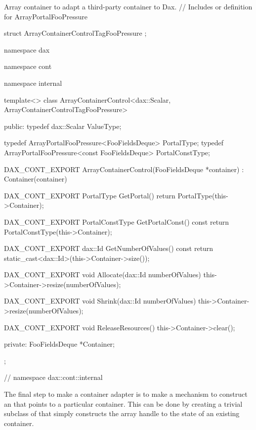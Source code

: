\begin{daxexample}{Array container to adapt a third-party container to Dax.}
// Includes or definition for ArrayPortalFooPressure

struct ArrayContainerControlTagFooPressure {  };

namespace dax {
namespace cont {
namespace internal {

template<>
class ArrayContainerControl<dax::Scalar, ArrayContainerControlTagFooPressure>
{
public:
  typedef dax::Scalar ValueType;

  typedef ArrayPortalFooPressure<FooFieldsDeque> PortalType;
  typedef ArrayPortalFooPressure<const FooFieldsDeque> PortalConstType;

  DAX_CONT_EXPORT
  ArrayContainerControl(FooFieldsDeque *container) : Container(container) {  }

  DAX_CONT_EXPORT
  PortalType GetPortal() { return PortalType(this->Container); }

  DAX_CONT_EXPORT
  PortalConstType GetPortalConst() const { return PortalConstType(this->Container); }

  DAX_CONT_EXPORT
  dax::Id GetNumberOfValues() const {
    return static_cast<dax::Id>(this->Container->size());
  }

  DAX_CONT_EXPORT
  void Allocate(dax::Id numberOfValues) { this->Container->resize(numberOfValues); }

  DAX_CONT_EXPORT
  void Shrink(dax::Id numberOfValues) { this->Container->resize(numberOfValues); }

  DAX_CONT_EXPORT
  void ReleaseResources() { this->Container->clear(); }

private:
  FooFieldsDeque *Container;
};

}
}
} // namespace dax::cont::internal
\end{daxexample}

The final step to make a container adapter is to make a mechanism to
construct an  that points to a particular
container. This can be done by creating a trivial subclass of
 that simply constructs the array handle to the state
of an existing container. 

